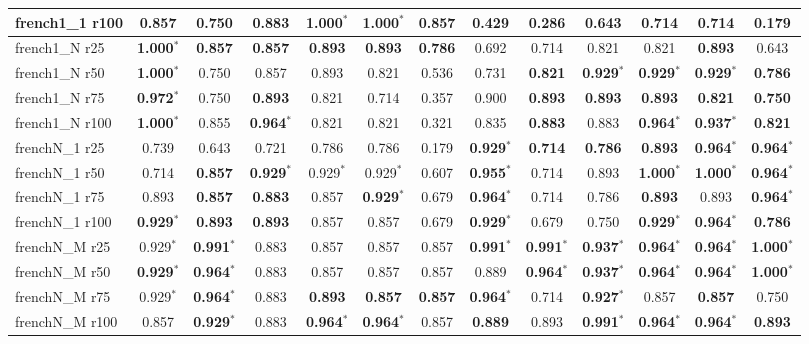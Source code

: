 \begin{table}[t]
{\begin{tabular}{l||cccccc||cccccc}
french1\_1 r100 & \textbf{0.857} & \textbf{0.750} & \textbf{0.883} & \textbf{1.000}$^*$ & \textbf{1.000}$^*$ & \textbf{0.857} & 0.429 & 0.286 & 0.643 & 0.714 & 0.714 & 0.179 \\
\hline
french1\_N r25 & \textbf{1.000}$^*$ & \textbf{0.857} & \textbf{0.857} & \textbf{0.893} & \textbf{0.893} & \textbf{0.786} & 0.692 & 0.714 & 0.821 & 0.821 & \textbf{0.893} & 0.643 \\
french1\_N r50 & \textbf{1.000}$^*$ & 0.750 & 0.857 & 0.893 & 0.821 & 0.536 & 0.731 & \textbf{0.821} & \textbf{0.929}$^*$ & \textbf{0.929}$^*$ & \textbf{0.929}$^*$ & \textbf{0.786} \\
french1\_N r75 & \textbf{0.972}$^*$ & 0.750 & \textbf{0.893} & 0.821 & 0.714 & 0.357 & 0.900 & \textbf{0.893} & \textbf{0.893} & \textbf{0.893} & \textbf{0.821} & \textbf{0.750} \\
french1\_N r100 & \textbf{1.000}$^*$ & 0.855 & \textbf{0.964}$^*$ & 0.821 & 0.821 & 0.321 & 0.835 & \textbf{0.883} & 0.883 & \textbf{0.964}$^*$ & \textbf{0.937}$^*$ & \textbf{0.821} \\
\hline
frenchN\_1 r25 & 0.739 & 0.643 & 0.721 & 0.786 & 0.786 & 0.179 & \textbf{0.929}$^*$ & \textbf{0.714} & \textbf{0.786} & \textbf{0.893} & \textbf{0.964}$^*$ & \textbf{0.964}$^*$ \\
frenchN\_1 r50 & 0.714 & \textbf{0.857} & \textbf{0.929}$^*$ & 0.929$^*$ & 0.929$^*$ & 0.607 & \textbf{0.955}$^*$ & 0.714 & 0.893 & \textbf{1.000}$^*$ & \textbf{1.000}$^*$ & \textbf{0.964}$^*$ \\
frenchN\_1 r75 & 0.893 & \textbf{0.857} & \textbf{0.883} & 0.857 & \textbf{0.929}$^*$ & 0.679 & \textbf{0.964}$^*$ & 0.714 & 0.786 & \textbf{0.893} & 0.893 & \textbf{0.964}$^*$ \\
frenchN\_1 r100 & \textbf{0.929}$^*$ & \textbf{0.893} & \textbf{0.893} & 0.857 & 0.857 & 0.679 & \textbf{0.929}$^*$ & 0.679 & 0.750 & \textbf{0.929}$^*$ & \textbf{0.964}$^*$ & \textbf{0.786} \\
\hline
frenchN\_M r25 & 0.929$^*$ & \textbf{0.991}$^*$ & 0.883 & 0.857 & 0.857 & 0.857 & \textbf{0.991}$^*$ & \textbf{0.991}$^*$ & \textbf{0.937}$^*$ & \textbf{0.964}$^*$ & \textbf{0.964}$^*$ & \textbf{1.000}$^*$ \\
frenchN\_M r50 & \textbf{0.929}$^*$ & \textbf{0.964}$^*$ & 0.883 & 0.857 & 0.857 & 0.857 & 0.889 & \textbf{0.964}$^*$ & \textbf{0.937}$^*$ & \textbf{0.964}$^*$ & \textbf{0.964}$^*$ & \textbf{1.000}$^*$ \\
frenchN\_M r75 & 0.929$^*$ & \textbf{0.964}$^*$ & 0.883 & \textbf{0.893} & \textbf{0.857} & \textbf{0.857} & \textbf{0.964}$^*$ & 0.714 & \textbf{0.927}$^*$ & 0.857 & \textbf{0.857} & 0.750 \\
frenchN\_M r100 & 0.857 & \textbf{0.929}$^*$ & 0.883 & \textbf{0.964}$^*$ & \textbf{0.964}$^*$ & 0.857 & \textbf{0.889} & 0.893 & \textbf{0.991}$^*$ & \textbf{0.964}$^*$ & \textbf{0.964}$^*$ & \textbf{0.893} \\
\hline
\end{tabular}%
}
\end{table}

